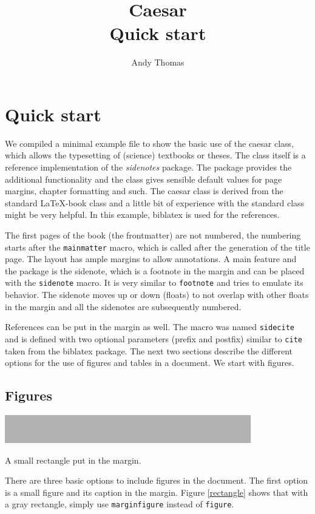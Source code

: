 \documentclass{caesar_book}
\title{Caesar\\Quick start}
\author{Andy Thomas}
\begin{document}
\frontmatter
\maketitlepage
\tableofcontents
\mainmatter
\chapter{Quick start}
%
We compiled a minimal example file to show the basic use of the caesar class, which allows the typesetting of (science) textbooks or theses. The class itself is a reference implementation of the \emph{sidenotes} package. The package provides the additional functionality and the class gives sensible default values for page margins, chapter formatting and such. The caesar class is derived from the standard \LaTeX-book class and a little bit of experience with the standard class might be very helpful. In this example, biblatex is used for the references.

The first pages of the book (the frontmatter) are not numbered, the numbering starts after the \texttt{mainmatter} macro, which is called after the generation of the title page. The layout has ample margins to allow annotations. A main feature and the package is the sidenote, which is a footnote in the margin and can be placed with the \texttt{sidenote} macro. It is very similar to \texttt{footnote} and tries to emulate its behavior. The sidenote moves up or down (floats) to not overlap with other floats in the margin and all the sidenotes are subsequently numbered. 

References can be put in the margin as well. The macro was named \texttt{sidecite} and is defined with two optional parameters (prefix and postfix) similar to \texttt{cite} taken from the biblatex package. The next two sections describe the different options for the use of figures and tables in a document. We start with figures.
\section{Figures}
%
\begin{marginfigure}%
    \includegraphics[width=\marginparwidth]{rectangle}%
    \caption{A small rectangle put in the margin.\label{rectangle}}%
\end{marginfigure}%
%
There are three basic options to include figures in the document. The first option is a small figure and its caption in the margin. Figure \ref{rectangle} shows that with a gray rectangle, simply use \texttt{marginfigure} instead of \texttt{figure}. 
\end{document}
